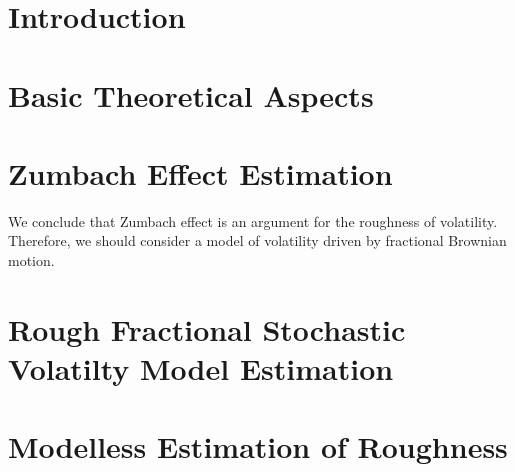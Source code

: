 


    \maketitlepage

    \begin{abstract}
        
    \end{abstract}

    \tableofcontents{}

    \listoffigures{}
    \listoftables{}

    
    \chapter*{Introduction}\setcounter{page}{3}

        

    \chapter{Basic Theoretical Aspects}

        

    \chapter{Zumbach Effect Estimation}

        

        

        We conclude that Zumbach effect is an argument for the roughness of volatility. Therefore, we should consider a model of volatility driven by fractional Brownian motion.

    \chapter{Rough Fractional Stochastic Volatilty Model Estimation}

        

        

    \chapter{Modelless Estimation of Roughness}

